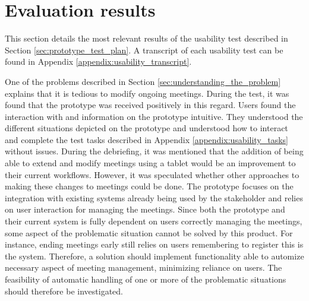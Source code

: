 \section{Evaluation results}\label{sec:usability_evaluation_results}
This section details the most relevant results of the usability test described in Section \ref{sec:prototype_test_plan}.
A transcript of each usability test can be found in Appendix \ref{appendix:usability_transcript}.

One of the problems described in Section \ref{sec:understanding_the_problem} explains that it is tedious to modify ongoing meetings. 
During the test, it was found that the prototype was received positively in this regard. 
Users found the interaction with and information on the prototype intuitive. 
They understood the different situations depicted on the prototype and understood how to interact and complete the test tasks described in Appendix \ref{appendix:usability_tasks} without issues.
During the debriefing, it was mentioned that the addition of being able to extend and modify meetings using a tablet would be an improvement to their current workflows.
However, it was speculated whether other approaches to making these changes to meetings could be done. 
The prototype focuses on the integration with existing systems already being used by the stakeholder and relies on user interaction for managing the meetings.
Since both the prototype and their current system is fully dependent on users correctly managing the meetings, some aspect of the problematic situation cannot be solved by this product. 
For instance, ending meetings early still relies on users remembering to register this is the system. 
Therefore, a solution should implement functionality able to automize necessary aspect of meeting management, minimizing reliance on users.
The feasibility of  automatic handling of one or more of the problematic situations should therefore be investigated.
